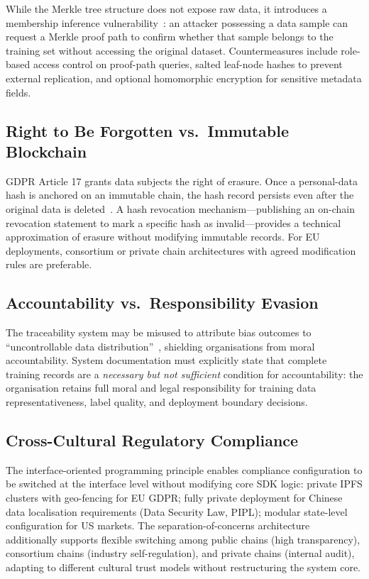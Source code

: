 \documentclass[10pt,twocolumn]{article}
\begin{document}
While the Merkle tree structure does not expose raw data, it introduces a membership
inference vulnerability~\cite{shokri2017}: an attacker possessing a data sample can
request a Merkle proof path to confirm whether that sample belongs to the training set
without accessing the original dataset. Countermeasures include role-based access
control on proof-path queries, salted leaf-node hashes to prevent external replication, and
optional homomorphic encryption for sensitive metadata fields.

\subsection{Right to Be Forgotten vs.\ Immutable Blockchain}

GDPR Article 17 grants data subjects the right of erasure. Once a personal-data hash is
anchored on an immutable chain, the hash record persists even after the original data is
deleted~\cite{politou2018}. A hash revocation mechanism---publishing an on-chain
revocation statement to mark a specific hash as invalid---provides a technical
approximation of erasure without modifying immutable records. For EU deployments,
consortium or private chain architectures with agreed modification rules are preferable.

\subsection{Accountability vs.\ Responsibility Evasion}

The traceability system may be misused to attribute bias outcomes to ``uncontrollable
data distribution''~\cite{pasquale2015}, shielding organisations from moral
accountability. System documentation must explicitly state that complete training records
are a \emph{necessary but not sufficient} condition for accountability: the organisation
retains full moral and legal responsibility for training data representativeness, label
quality, and deployment boundary decisions.

\subsection{Cross-Cultural Regulatory Compliance}

The interface-oriented programming principle enables compliance configuration to be
switched at the interface level without modifying core SDK logic: private IPFS clusters
with geo-fencing for EU GDPR; fully private deployment for Chinese data localisation
requirements (Data Security Law, PIPL); modular state-level configuration for US markets.
The separation-of-concerns architecture additionally supports flexible switching among
public chains (high transparency), consortium chains (industry self-regulation), and
private chains (internal audit), adapting to different cultural trust models without
restructuring the system core.
\end{document}
